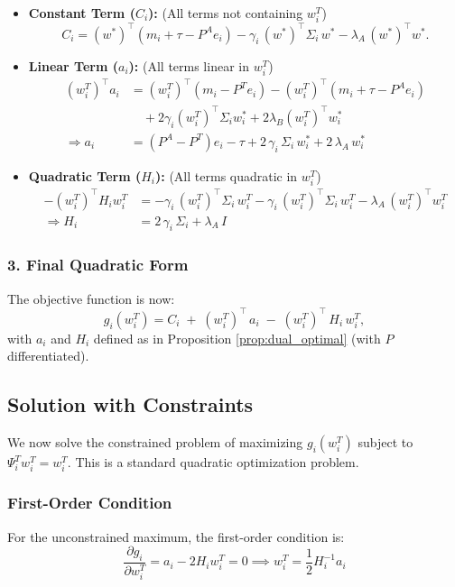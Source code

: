 \begin{itemize}
  \item \textbf{Constant Term ($C_i$):} (All terms not containing $w_i^T$)
    \[
      C_i = (w^*)^\top (m_i + \tau - P^A e_i) 
            - \gamma_i\,(w^*)^\top \Sigma_i\,w^*
            - \lambda_A\,(w^*)^\top w^*.
    \]
  
  \item \textbf{Linear Term ($a_i$):} (All terms linear in $w_i^T$)
    \begin{align*}
      (w_i^T)^\top a_i &= (w_i^T)^\top (m_i - P^T e_i) - (w_i^T)^\top (m_i + \tau - P^A e_i) \\
                      &\quad + 2\gamma_i (w_i^T)^\top \Sigma_i w_i^* + 2\lambda_B (w_i^T)^\top w_i^* \\
      \Rightarrow a_i &= (P^A - P^T)e_i - \tau
                      + 2\,\gamma_i\,\Sigma_i\,w_i^*
                      + 2\,\lambda_A\,w_i^*
    \end{align*}
    
  \item \textbf{Quadratic Term ($H_i$):} (All terms quadratic in $w_i^T$)
    \begin{align*}
      -(w_i^T)^\top H_i w_i^T &= - \gamma_i\,(w_i^T)^\top \Sigma_i\,w_i^T - \gamma_i\,(w_i^T)^\top \Sigma_i\,w_i^T - \lambda_A\,(w_i^T)^\top w_i^T \\
      \Rightarrow H_i &= 2\,\gamma_i\,\Sigma_i + \lambda_A\,I
    \end{align*}
\end{itemize}

\subsubsection{3. Final Quadratic Form}
The objective function is now:
\[
g_i(w_i^T)
= C_i
\;+\;(w_i^T)^\top\,a_i
\;-\;(w_i^T)^\top\,H_i\,w_i^T,
\]
with $a_i$ and $H_i$ defined as in Proposition \ref{prop:dual_optimal} (with $P$ differentiated).

\subsection{Solution with Constraints}
We now solve the constrained problem of maximizing $g_i(w_i^T)$ subject to $\Psi_i^T w_i^T = w_i^T$. This is a standard quadratic optimization problem.

\subsubsection{First-Order Condition}
For the unconstrained maximum, the first-order condition is:
\begin{equation}
\frac{\partial g_i}{\partial w_i^T} = a_i - 2H_i w_i^T = 0 \implies w_i^T = \frac{1}{2}H_i^{-1} a_i
\end{equation}

